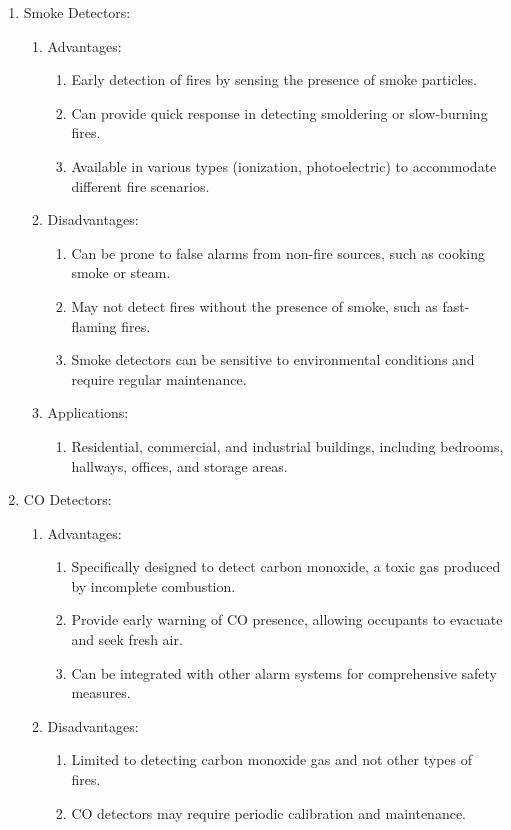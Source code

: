 \documentclass{article}
\begin{document}
\begin{enumerate}
\begin{enumerate}
  \end{enumerate}
  \item Smoke Detectors:
  \begin{enumerate}
    \item Advantages:
    \begin{enumerate}
      \item Early detection of fires by sensing the presence of smoke particles.
      \item Can provide quick response in detecting smoldering or slow-burning fires.
      \item Available in various types (ionization, photoelectric) to accommodate different fire scenarios.
    \end{enumerate}
    \item Disadvantages:
    \begin{enumerate}
      \item Can be prone to false alarms from non-fire sources, such as cooking smoke or steam.
      \item May not detect fires without the presence of smoke, such as fast-flaming fires.
      \item Smoke detectors can be sensitive to environmental conditions and require regular maintenance.
    \end{enumerate}
    \item Applications:
    \begin{enumerate}
      \item Residential, commercial, and industrial buildings, including bedrooms, hallways, offices, and storage areas.
    \end{enumerate}
    
  \end{enumerate}
  
  \item CO Detectors:
  \begin{enumerate}
    \item Advantages:
    \begin{enumerate}
      \item Specifically designed to detect carbon monoxide, a toxic gas produced by incomplete combustion.
      \item Provide early warning of CO presence, allowing occupants to evacuate and seek fresh air.
      \item Can be integrated with other alarm systems for comprehensive safety measures.
    \end{enumerate}
    \item Disadvantages:
    \begin{enumerate}
      \item Limited to detecting carbon monoxide gas and not other types of fires.
      \item CO detectors may require periodic calibration and maintenance.
    \end{enumerate}
    

\end{enumerate}
\end{enumerate}
\end{document}
